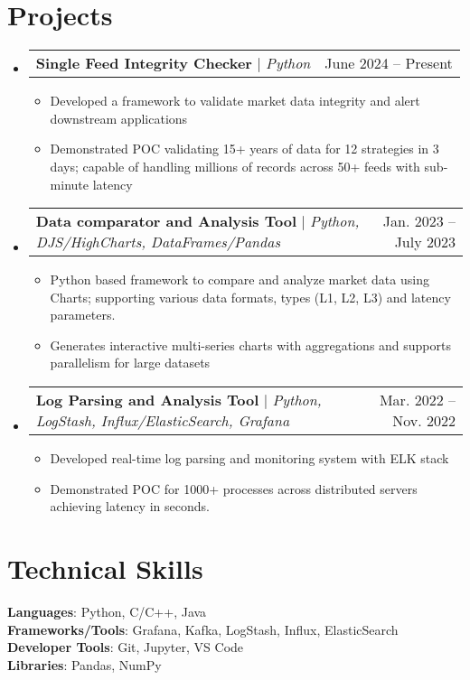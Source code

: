 \documentclass[letterpaper,11pt]{article}
\makeatletter
\newcommand{\resumeItem}[1]{
    \item\small{
        {#1 \vspace{-2pt}}
    }
}
\newcommand{\resumeProjectHeading}[2]{
    \item
        \begin{tabular*}{0.97\textwidth}{l@{\extracolsep{\fill}}r}
            \small#1 & #2 \\
        \end{tabular*}\vspace{-7pt}
}
\newcommand{\resumeSubHeadingListStart}{\begin{itemize}[leftmargin=0.15in, label={}]}
\newcommand{\resumeSubHeadingListEnd}{\end{itemize}}
\newcommand{\resumeItemListStart}{\begin{itemize}}
\newcommand{\resumeItemListEnd}{\end{itemize}\vspace{-5pt}}
\makeatother
\begin{document}
\section{Projects}
    \resumeSubHeadingListStart
        \resumeProjectHeading
            {\textbf{Single Feed Integrity Checker} $|$ \emph{Python}}
            {June 2024 -- Present}
            \resumeItemListStart
                \resumeItem{
                    Developed a framework to validate market data integrity %
                    and alert downstream applications
                }
                \resumeItem{
                    Demonstrated POC validating 15+ years of data for 12 %
                    strategies in 3 days; capable of handling millions of %
                    records across 50+ feeds with sub-minute latency
                }
            \resumeItemListEnd
        \resumeProjectHeading
            {\textbf{Data comparator and Analysis Tool} $|$ \emph{Python, DJS/HighCharts, DataFrames/Pandas}}
            {Jan. 2023 -- July 2023}
            \resumeItemListStart
                \resumeItem{
                    Python based framework to compare and analyze market data %
                    using Charts; supporting various data formats, types %
                    (L1, L2, L3) and latency parameters.
                }
                \resumeItem{
                    Generates interactive multi-series charts with %
                    aggregations and supports parallelism for large datasets
                }
            \resumeItemListEnd
        \resumeProjectHeading
            {\textbf{Log Parsing and Analysis Tool} $|$ \emph{Python, LogStash, Influx/ElasticSearch, Grafana}}
            {Mar. 2022 -- Nov. 2022}
            \resumeItemListStart
                \resumeItem{
                    Developed real-time log parsing and monitoring system with %
                    ELK stack
                }
                \resumeItem{
                    Demonstrated POC for 1000+ processes across distributed %
                    servers achieving latency in seconds.
                }
            \resumeItemListEnd
    \resumeSubHeadingListEnd

\section{Technical Skills}
    \begin{itemize}[leftmargin=0.15in, label={}]
        \small{\item{
            \textbf{Languages}{: Python, C/C++, Java} \\
            \textbf{Frameworks/Tools}{: Grafana, Kafka, LogStash, Influx, ElasticSearch} \\
            \textbf{Developer Tools}{: Git, Jupyter, VS Code} \\
            \textbf{Libraries}{: Pandas, NumPy}
        }}
    \end{itemize}

\end{document}
